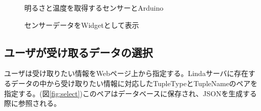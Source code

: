 \begin{enumerate}
\begin{figure}[htbp]
  \begin{minipage}{\hsize}
    \begin{center}
    \end{center}
    \caption{明るさと温度を取得するセンサーとArduino}
    \label{fig:arduino_sensor}
  \end{minipage}
\end{figure}

\begin{figure}[htbp]
  \begin{minipage}{\hsize}
    \begin{center}
    \end{center}
    \caption{センサーデータをWidgetとして表示}
    \label{fig:sensor_widget}
  \end{minipage}
\end{figure}

\end{enumerate}

\subsection{ユーザが受け取るデータの選択}

ユーザは受け取りたい情報をWebページ上から指定する。Lindaサーバに存在するデータの中から受け取りたい情報に対応したTupleTypeとTupleNameのペアを指定する。(図\ref{fig:select})このペアはデータベースに保存され、JSONを生成する際に参照される。

